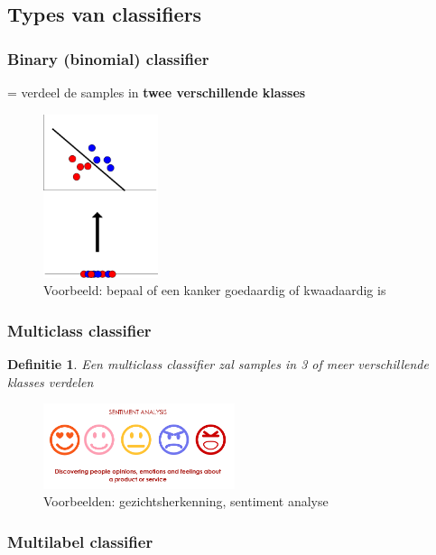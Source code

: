 \documentclass{article}
\newtheorem{theorem}{Definitie}[section]
\begin{document}
\subsection{Types van classifiers}

\subsubsection{Binary (binomial) classifier}

= verdeel de samples in \textbf{twee verschillende klasses}

\begin{figure}[H]
    \centering
    \includegraphics[width=0.3\textwidth]{binary-class.png}
    \caption{Voorbeeld: bepaal of een kanker goedaardig of kwaadaardig is}
\end{figure}

\subsubsection{Multiclass classifier}

\begin{theorem}
    Een multiclass classifier zal samples in 3 of meer verschillende klasses verdelen
\end{theorem}

\begin{figure}[H]
    \centering
    \includegraphics[width=0.5\textwidth]{multiclass-classifier.png}
    \caption{Voorbeelden: gezichtsherkenning, sentiment analyse}
\end{figure}

\subsubsection{Multilabel classifier}
\end{document}

